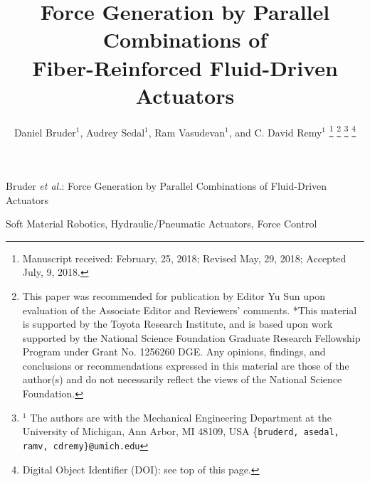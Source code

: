 \documentclass[letterpaper, 10 pt, journal, twoside]{IEEEtran}
\title{\LARGE \bf
Force Generation by Parallel Combinations of \\ Fiber-Reinforced Fluid-Driven Actuators
}
\author{Daniel Bruder$^{1}$, %
        Audrey Sedal$^{1}$, %
        Ram Vasudevan$^{1}$, %
        and C. David Remy$^{1}$%
\thanks{Manuscript received: February, 25, 2018; Revised May, 29, 2018; Accepted July, 9, 2018.}    %
\thanks{This paper was recommended for publication by Editor Yu Sun upon evaluation of the Associate Editor and Reviewers' comments.
*This material is supported by the Toyota Research Institute, and is based upon work supported by the National Science Foundation Graduate Research Fellowship Program under Grant No. 1256260 DGE. Any opinions, findings, and conclusions or recommendations expressed in this material are those of the author(s) and do not necessarily reflect the views of the National Science Foundation.}%
\thanks{$^{1}$ The authors are with the Mechanical Engineering Department at the 
        University of Michigan, Ann Arbor, MI 48109, USA
        \{\tt\small bruderd, asedal, ramv, cdremy\}@umich.edu}%
\thanks{Digital Object Identifier (DOI): see top of this page.}
}
\begin{document}
\maketitle

{Bruder \MakeLowercase{\textit{et al.}}: Force Generation by Parallel Combinations of Fluid-Driven Actuators}  %

\begin{abstract}

\end{abstract}

\begin{IEEEkeywords}
Soft Material Robotics, Hydraulic/Pneumatic Actuators, Force Control
\end{IEEEkeywords}

\IEEEpeerreviewmaketitle

% 








% 




\end{document}
